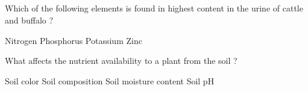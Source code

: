 
\subsection*{}

\begin{questions}

\question Which of the following elements is found in highest content in the urine of cattle and buffalo ?
  \begin{choices}
  \choice Nitrogen
  \choice Phosphorus
  \choice Potassium
  \choice Zinc
  \end{choices}

\question What affects the nutrient availability to a plant from the soil ?
  \begin{choices}
  \choice Soil color
  \choice Soil composition
  \choice Soil moisture content
  \choice Soil pH
  \end{choices}

\question
  \begin{choices}
  \choice
  \choice
  \choice
  \choice
  \end{choices}

\question
  \begin{choices}
  \choice
  \choice
  \choice
  \choice
  \end{choices}

\question
  \begin{choices}
  \choice
  \choice
  \choice
  \choice
  \end{choices}

\question
  \begin{choices}
  \choice
  \choice
  \choice
  \choice
  \end{choices}

\question
  \begin{choices}
  \choice
  \choice
  \choice
  \choice
  \end{choices}

\question
  \begin{choices}
  \choice
  \choice
  \choice
  \choice
  \end{choices}

\question
  \begin{choices}
  \choice
  \choice
  \choice
  \choice
  \end{choices}

\question
  \begin{choices}
  \choice
  \choice
  \choice
  \choice
  \end{choices}


\end{questions}
